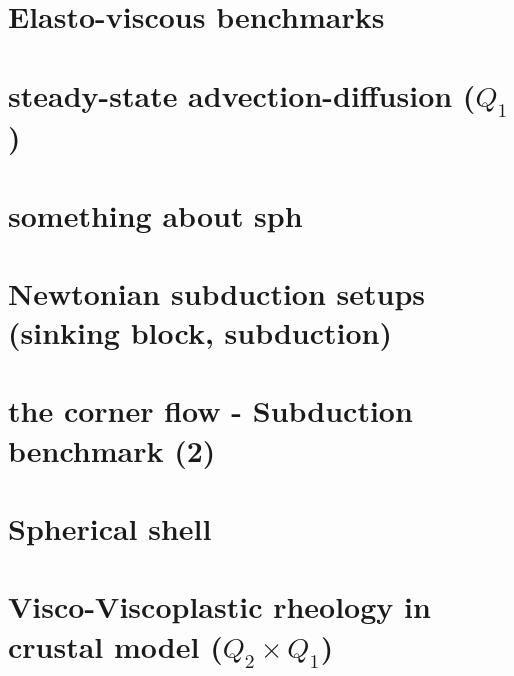 \documentclass[a4paper,11pt]{report}
\begin{document}
\chapter{Elasto-viscous benchmarks \label{f64}} %

\chapter{steady-state advection-diffusion ($Q_1$) \label{f65}} %

\chapter{something about sph \label{f66}} %

\chapter{Newtonian subduction setups (sinking block, subduction)\label{f67}} %

\chapter{the corner flow - Subduction benchmark (2) \label{f68}} %

\chapter{Spherical shell \label{f69}} %

\chapter{Visco-Viscoplastic rheology in crustal model ($Q_2\times Q_1$)\label{f70}} %
\end{document}
